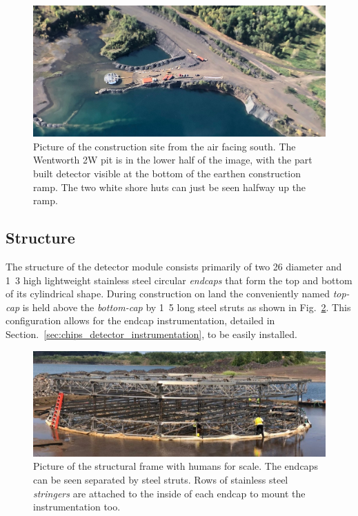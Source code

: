 \begin{figure} %
    \includegraphics[width=\textwidth]{diagrams/4-chips/from_the_air.pdf}
    \caption[Picture of the \chipsfive construction site from the air]
    {Picture of the \chipsfive construction site from the air facing south. The Wentworth 2W pit
        is in the lower half of the image, with the part built \chipsfive detector visible at the
        bottom of the earthen construction ramp. The two white shore huts can just be seen halfway
        up the ramp.}
    \label{fig:from_the_sky}
\end{figure}

\subsection{Structure} %
\label{sec:chips_detector_structure} %

The structure of the \chipsfive detector module consists primarily of two \unit{26}{}
diameter and \unit{1.3}{} high lightweight stainless steel circular \emph{endcaps} that
form the top and bottom of its cylindrical shape. During construction on land the conveniently
named \emph{top-cap} is held above the \emph{bottom-cap} by \unit{1.5}{} long steel
struts as shown in Fig.~\ref{fig:frame}. This configuration allows for the endcap instrumentation,
detailed in Section.~\ref{sec:chips_detector_instrumentation}, to be easily installed.

\begin{figure} %
    \includegraphics[width=\textwidth]{diagrams/4-chips/frame.pdf}
    \caption[Picture of the \chipsfive structural frame]
    {Picture of the \chipsfive structural frame with humans for scale. The endcaps can be seen
        separated by steel struts. Rows of stainless steel \emph{stringers} are attached to the
        inside of each endcap to mount the instrumentation too.}
    \label{fig:frame}
\end{figure}

